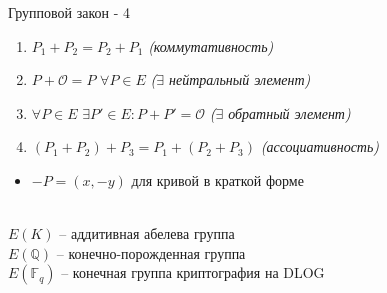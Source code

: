 \documentclass{beamer}
\begin{document}
\begin{frame}{Групповой закон - 4}%
    \begin{tcolorbox}[colframe=title-and-section-color!120, colback=title-and-section-color!5, title=Теорема, center title]
    \begin{enumerate}
        \item $P_1 + P_2 = P_2 + P_1$ \hfill \textit{(коммутативность)}
        
        \item $P + \mathcal{O} = P$ $\forall P \in E$ \hfill \textit{($\exists$ нейтральный элемент)}
        
        \item $\forall P \in E$ $\exists P' \in E: P + P' = \mathcal{O}$ \hfill \textit{($\exists$ обратный элемент)}
        
        \item $\left( P_1 + P_2 \right) + P_3 = P_1 + \left( P_2 + P_3 \right)$ \hfill \textit{(ассоциативность)}
    \end{enumerate}
    \end{tcolorbox}
    
    \begin{itemize}
        \item $-P = (x,-y)$ для кривой в краткой форме
    \end{itemize}
    
     \\$
    E(K)$ -- аддитивная абелева группа
    \\
    $E(\mathbb{Q})$ -- конечно-порожденная группа
    \\
    $E(\mathbb{F}_q)$ -- конечная группа \structure{$\Rightarrow$} криптография на DLOG
\end{frame}
\end{document}
